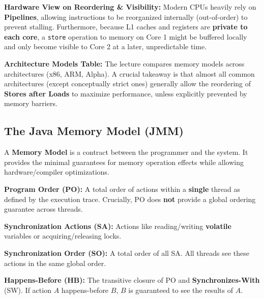 \begin{important}
    \textbf{Hardware View on Reordering \& Visibility:} Modern CPUs heavily rely on \textbf{Pipelines}, allowing instructions to be reorganized internally (out-of-order) to prevent stalling. Furthermore, because L1 caches and registers are \textbf{private to each core}, a \texttt{store} operation to memory on Core 1 might be buffered locally and only become visible to Core 2 at a later, unpredictable time.
\end{important}

\begin{remark}
    \textbf{Architecture Models Table:} The lecture compares memory models across architectures (x86, ARM, Alpha). A crucial takeaway is that almost all common architectures (except conceptually strict ones) generally allow the reordering of \textbf{Stores after Loads} to maximize performance, unless explicitly prevented by memory barriers.
\end{remark}

\subsection{The Java Memory Model (JMM)}

\begin{definition} 
    A \textbf{Memory Model} is a contract between the programmer and the system. It provides the minimal guarantees for memory operation effects while allowing hardware/compiler optimizations.
\end{definition}

\begin{definition} 
    \textbf{Program Order (PO):} A total order of actions within a \textbf{single} thread as defined by the execution trace. Crucially, PO does \textbf{not} provide a global ordering guarantee across threads.
\end{definition}

\begin{definition} 
    \textbf{Synchronization Actions (SA):} Actions like reading/writing \textbf{volatile} variables or acquiring/releasing locks.
\end{definition}

\begin{definition} 
    \textbf{Synchronization Order (SO):} A total order of all SA. All threads see these actions in the same global order.
\end{definition}

\begin{definition} 
    \textbf{Happens-Before (HB):} The transitive closure of PO and \textbf{Synchronizes-With} (SW). If action $A$ happens-before $B$, $B$ is guaranteed to see the results of $A$.
\end{definition}

